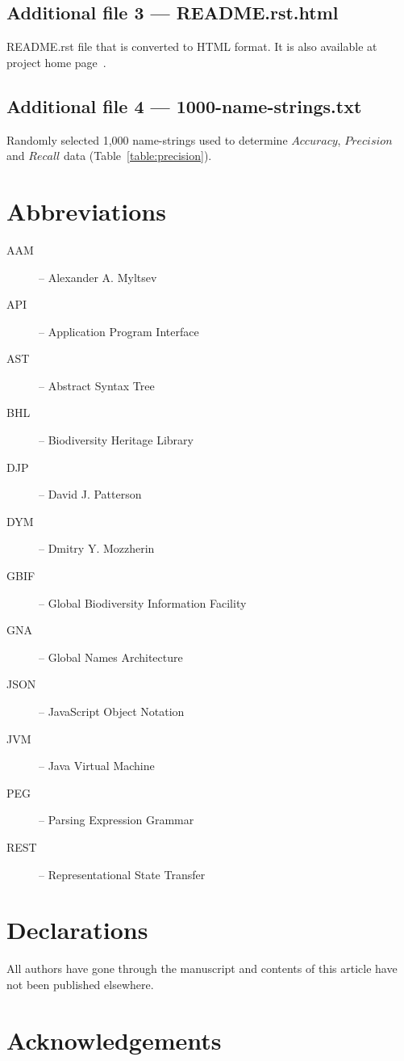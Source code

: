 \documentclass{bmcart}
\begin{document}
  \subsection*{Additional file 3 --- README.rst.html} README.rst file that is converted to HTML format. It is also available at project home page~\cite{gnparser}.

  \subsection*{Additional file 4 --- 1000-name-strings.txt} Randomly selected 1,000 name-strings used to determine $Accuracy$, $Precision$ and $Recall$ data (Table~\ref{table:precision}).

\section*{Abbreviations}

\begin{description}
  \item[AAM] -- Alexander A. Myltsev
  \item[API] -- Application Program Interface
  \item[AST] -- Abstract Syntax Tree
  \item[BHL] -- Biodiversity Heritage Library
  \item[DJP] -- David J. Patterson
  \item[DYM] -- Dmitry Y. Mozzherin
  \item[GBIF] -- Global Biodiversity Information Facility
  \item[GNA] -- Global Names Architecture
  \item[JSON] -- JavaScript Object Notation
  \item[JVM] -- Java Virtual Machine
  \item[PEG] -- Parsing Expression Grammar
  \item[REST] -- Representational State Transfer
\end{description}

\section*{Declarations}

All authors have gone through the manuscript and contents of this article have
not been published elsewhere.

\section*{Acknowledgements}
\end{document}
